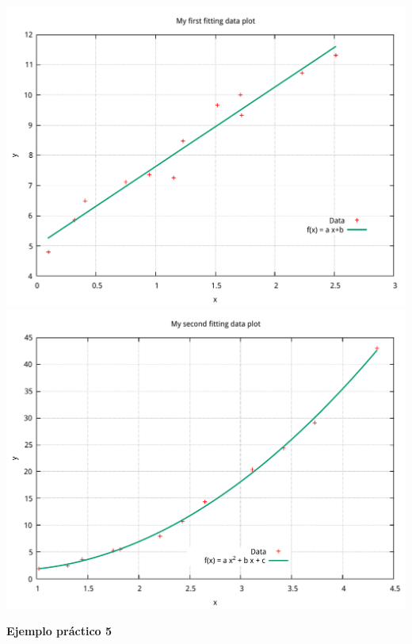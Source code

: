 \documentclass[11.5pt,a4paper]{article}
\begin{document}
\includegraphics[scale=0.40]{ejemplo8.pdf}
\includegraphics[scale=0.40]{ejemplo9.pdf}

\textbf{Ejemplo práctico 5}
\end{document}
